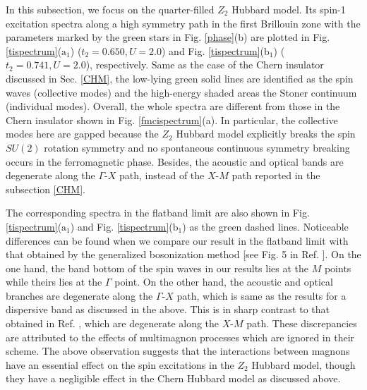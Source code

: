 \documentclass[amsmath,superscriptaddress,showpacs,aps,prb,twocolumn]{revtex4-1}
\begin{document}
\par In this subsection, we focus on the quarter-filled $Z_2$ Hubbard model. Its spin-1 excitation spectra along a high symmetry path in the first Brillouin zone with the parameters marked by the green stars in Fig. \ref{phase}(b) are plotted in Fig. \ref{tispectrum}($\text{a}_1$) ($t_2=0.650, U=2.0$) and Fig. \ref{tispectrum}($\text{b}_1$) ($t_2=0.741, U=2.0$), respectively. Same as the case of the Chern insulator discussed in Sec. \ref{CHM}, the low-lying green solid lines are identified as the spin waves (collective modes) and the high-energy shaded areas the Stoner continuum (individual modes). Overall, the whole spectra are different from those in the Chern insulator shown in Fig. \ref{fmcispectrum}(a). In particular, the collective modes here are gapped because the $Z_2$ Hubbard model explicitly breaks the spin $SU(2)$ rotation symmetry and no spontaneous continuous symmetry breaking occurs in the ferromagnetic phase. Besides, the acoustic and optical bands are degenerate along the $\Gamma$-$X$ path, instead of the $X$-$M$ path reported in the subsection \ref{CHM}.

\par The corresponding spectra in the flatband limit are also shown in Fig. \ref{tispectrum}($\text{a}_1$) and Fig. \ref{tispectrum}($\text{b}_1$) as the green dashed lines. Noticeable differences can be found when we compare our result in the flatband limit with that obtained by the generalized bosonization method [see Fig. 5 in Ref. \cite{DG_PRB2015}]. On the one hand, the band bottom of the spin waves in our results lies at the $M$ points while theirs lies at the $\Gamma$ point. On the other hand, the acoustic and optical branches are degenerate along the $\Gamma$-$X$ path, which is same as the results for a dispersive band as discussed in the above. This is in sharp contrast to that obtained in Ref. \cite{DG_PRB2015}, which are degenerate along the $X$-$M$ path. These discrepancies are attributed to the effects of multimagnon processes which are ignored in their scheme. The above observation suggests that the interactions between magnons have an essential effect on the spin excitations in the $Z_2$ Hubbard model, though they have a negligible effect in the Chern Hubbard model as discussed above.
\end{document}
